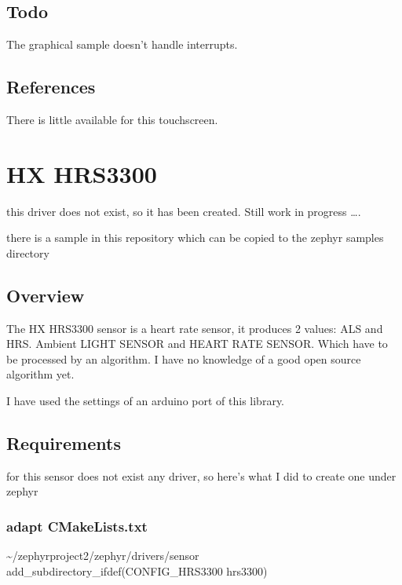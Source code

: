 \documentclass[letterpaper,10pt,english]{sphinxmanual}
\begin{document}
\subsection{Todo}
\label{\detokenize{drivers/cst816s:todo}}
The graphical sample doesn’t handle interrupts.


\subsection{References}
\label{\detokenize{drivers/cst816s:references}}
There is little available for this touchscreen.


\section{HX HRS3300}
\label{\detokenize{drivers/hrs3300:hx-hrs3300}}\label{\detokenize{drivers/hrs3300::doc}}
this driver does not exist, so it has been created.
Still work in progress ….

there is a sample in this repository which can be copied to the zephyr samples directory

\begin{sphinxVerbatim}[commandchars=\\\{\}]
\end{sphinxVerbatim}


\subsection{Overview}
\label{\detokenize{drivers/hrs3300:overview}}
The HX HRS3300 sensor is a heart rate sensor, it produces 2 values: ALS and HRS. Ambient LIGHT SENSOR and HEART RATE SENSOR. Which have to be processed by an algorithm. I have no knowledge of a good open source algorithm yet.

I have used the settings of an arduino port of this library.

\noindent{}


\subsection{Requirements}
\label{\detokenize{drivers/hrs3300:requirements}}
for this sensor does not exist any driver, so here’s what I did to create one under zephyr


\subsubsection{adapt CMakeLists.txt}
\label{\detokenize{drivers/hrs3300:adapt-cmakelists-txt}}
\textasciitilde{}/zephyrproject\sphinxhyphen{}2/zephyr/drivers/sensor
add\_subdirectory\_ifdef(CONFIG\_HRS3300           hrs3300)
\end{document}
